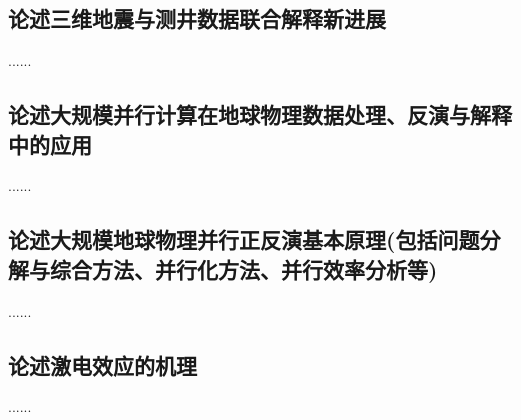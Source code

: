 \documentclass{coursework}
\begin{document}
	\subsection{论述三维地震与测井数据联合解释新进展}
	......
	\subsection{论述大规模并行计算在地球物理数据处理、反演与解释中的应用}
	......
	\subsection{论述大规模地球物理并行正反演基本原理(包括问题分解与综合方法、并行化方法、并行效率分析等)}
	......
	\subsection{论述激电效应的机理}
	......
	
	
\end{document}
